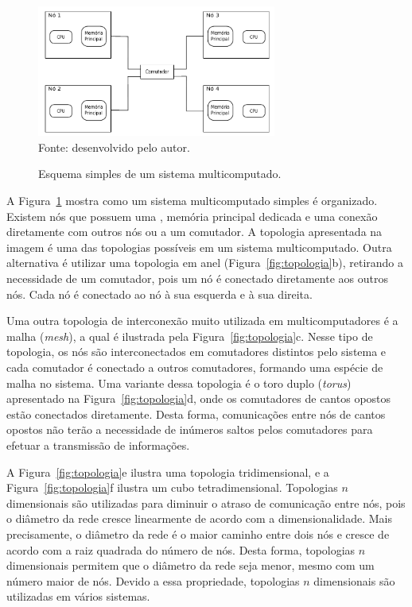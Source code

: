\begin{figure}[t]
	\centering
    \caption{Esquema simples de um sistema multicomputado.}
        \includegraphics[width=0.7\textwidth]{figs/multicomp.pdf} \\
        Fonte: desenvolvido pelo autor.
        \label{fig:multicomputado}
\end{figure}



A Figura~\ref{fig:multicomputado} mostra como um sistema multicomputado simples é
organizado. Existem nós que possuem uma \cpu, memória principal dedicada e uma
conexão diretamente com outros nós ou a um comutador. A topologia apresentada na
imagem é uma das topologias possíveis em um sistema multicomputado. Outra
alternativa é utilizar uma topologia em anel (Figura~\ref{fig:topologia}b), retirando a necessidade de um
comutador, pois um nó é conectado diretamente aos outros nós. Cada nó é
conectado ao nó à sua esquerda e à sua direita.

Uma outra topologia de interconexão muito utilizada em multicomputadores é a malha (\textit{mesh}),
a qual é ilustrada pela Figura~\ref{fig:topologia}c. Nesse tipo de topologia, os nós são interconectados
em comutadores distintos pelo sistema e cada comutador é conectado a outros
comutadores, formando uma espécie de malha no sistema. Uma variante dessa
topologia é o toro duplo (\textit{torus}) apresentado na Figura~\ref{fig:topologia}d, onde os
comutadores de cantos opostos estão conectados diretamente. Desta forma,
comunicações entre nós de cantos opostos não terão a necessidade de inúmeros
saltos pelos comutadores para efetuar a transmissão de informações.

A Figura~\ref{fig:topologia}e ilustra uma topologia tridimensional, e a
Figura~\ref{fig:topologia}f ilustra um cubo tetradimensional. Topologias
$n$ dimensionais são utilizadas para diminuir o atraso de comunicação entre nós,
pois o diâmetro da rede cresce linearmente de acordo com a dimensionalidade.
Mais precisamente, o diâmetro da rede é o maior caminho entre dois nós e cresce
de acordo com a raiz quadrada do número de nós. Desta
forma, topologias $n$ dimensionais permitem que o diâmetro da rede seja menor,
mesmo com um número maior de nós.
Devido a essa propriedade, topologias $n$ dimensionais são utilizadas em
vários sistemas.

